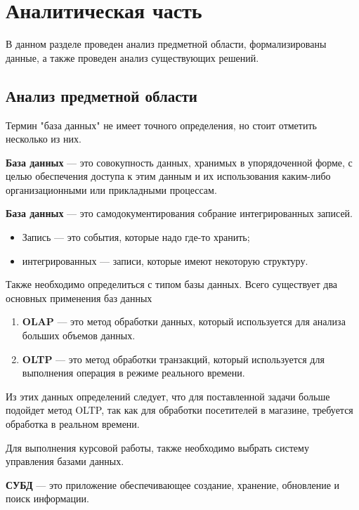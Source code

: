 \section{Аналитическая часть}

В данном разделе проведен анализ предметной области, формализированы данные,
а также проведен анализ существующих решений.

\subsection{Анализ предметной области}

Термин "база данных" не имеет точного определения, но стоит отметить несколько из них.


\textbf{База данных} \cite{bd-1} --- это совокупность данных, хранимых в упорядоченной форме, с целью
обеспечения доступа к этим данным и их использования каким-либо организационными
или прикладными процессам.

\textbf{База данных} --- это самодокументирования собрание интегрированных записей.

\begin{itemize}
    \item Запись --- это события, которые надо где-то хранить;
    \item интегрированных --- записи, которые имеют некоторую структуру.
\end{itemize}

Также необходимо определиться с типом базы данных. 
Всего существует два основных применения баз данных

\begin{enumerate}[label=\arabic*.]
    \item \textbf{OLAP} --- это метод обработки данных, который используется для анализа
                    больших объемов данных.
    \item \textbf{OLTP} --- это метод обработки транзакций, который используется для
                    выполнения операция в режиме реального времени.
\end{enumerate}

Из этих данных определений следует, что для поставленной задачи больше подойдет метод
OLTP, так как для обработки посетителей в магазине, требуется обработка в реальном времени.

Для выполнения курсовой работы, также необходимо выбрать систему управления базами данных.

\textbf{СУБД} --- это приложение обеспечивающее создание, хранение, обновление и поиск информации.

